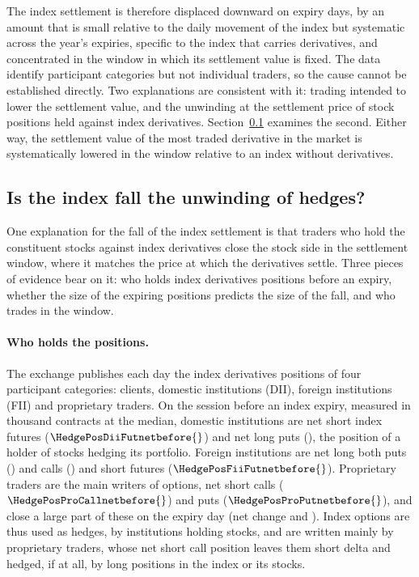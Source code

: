 The index settlement is therefore displaced downward on expiry days, by an amount that is small
relative to the daily movement of the index but systematic across the year's expiries, specific
to the index that carries derivatives, and concentrated in the window in which its settlement
value is fixed. The data identify participant categories but not individual traders, so the
cause cannot be established directly. Two explanations are consistent with it: trading intended
to lower the settlement value, and the unwinding at the settlement price of stock positions held
against index derivatives. Section~\ref{sec:hedges} examines the second. Either way, the settlement value of the most traded derivative in the market is systematically
lowered in the window relative to an index without derivatives.

\subsection{Is the index fall the unwinding of hedges?}\label{sec:hedges}

One explanation for the fall of the index settlement is that traders who hold the constituent
stocks against index derivatives close the stock side in the settlement window, where it
matches the price at which the derivatives settle. Three pieces of evidence bear on it: who
holds index derivatives positions before an expiry, whether the size of the expiring positions
predicts the size of the fall, and who trades in the window.

\paragraph{Who holds the positions.} The exchange publishes each day the index derivatives
positions of four participant categories: clients, domestic institutions (DII), foreign
institutions (FII) and proprietary traders. On the session before an index expiry, measured in
thousand contracts at the median, domestic institutions are net short index futures
($\HedgePosDiiFutnetbefore{}$) and net long puts (\HedgePosDiiPutnetbefore{}), the position of a
holder of stocks hedging its portfolio. Foreign institutions are net long both puts
(\HedgePosFiiPutnetbefore{}) and calls (\HedgePosFiiCallnetbefore{}) and short futures
($\HedgePosFiiFutnetbefore{}$). Proprietary traders are the main writers of options, net short
calls ($\HedgePosProCallnetbefore{}$) and puts ($\HedgePosProPutnetbefore{}$), and close a large
part of these on the expiry day (net change \HedgePosProCallnetchange{} and
\HedgePosProPutnetchange{}). Index options are thus used as hedges, by institutions holding
stocks, and are written mainly by proprietary traders, whose net short call position leaves them
short delta and hedged, if at all, by long positions in the index or its stocks.

